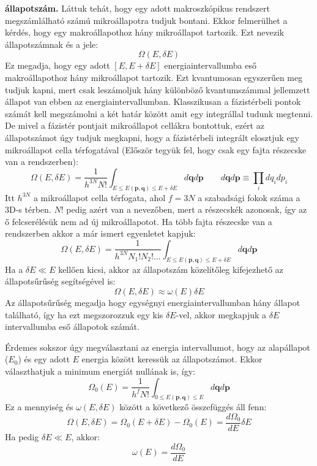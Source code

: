 \documentclass[../main.tex]{subfiles}
\begin{document}
\textbf{állapotszám.} Láttuk tehát, hogy egy adott makroszkópikus rendszert megszámlálható számú mikroállapotra tudjuk bontani. Ekkor felmerülhet a kérdés, hogy egy makroállapothoz hány mikroállapot tartozik.
Ezt nevezik állapotszámnak és a jele:
\begin{equation}
    \Omega(E, \delta E)
\end{equation}
Ez megadja, hogy egy adott $[E, E + \delta E]$ energiaintervallumba eső makroállapothoz hány mikroállapot tartozik. Ezt kvantumosan egyszerűen meg tudjuk kapni, mert csak leszámoljuk hány különböző kvantumszámmal jellemzett
állapot van ebben az energiaintervallumban. Klasszikusan a fázistérbeli pontok számát kell megszámolni a két határ között amit egy integrállal tudunk megtenni. De mivel a fázistér pontjait mikroállapot cellákra bontottuk, ezért
az állapotszámot úgy tudjuk megkapni, hogy a fázistérbeli integrált elosztjuk egy mikroállapot cella térfogatával (Először tegyük fel, hogy csak egy fajta részecske van a rendszerben):
\begin{equation}
    \Omega(E, \delta E) = \frac{1}{h^{3N} N!} \int_{E \leq E (\mathbf{p}, \mathbf{q}) \leq E + \delta E} d \mathbf{q} d \mathbf{p} \qquad d\mathbf{q} d\mathbf{p} \equiv \prod_i dq_i dp_i
\end{equation}
Itt $h^{3N}$ a mikroállapot cella térfogata, ahol $f = 3N$ a szabadsági fokok száma a 3D-s térben. $N!$ pedig azért van a nevezőben, mert a részecskék azonosak, így az ő felcserélésük nem ad új mikroállapotot.
Ha több fajta részecske van a rendszerben akkor a már ismert egyenletet kapjuk:
\begin{equation}
    \Omega(E, \delta E) = \frac{1}{h^{3N} N_1! N_2! \ldots} \int_{E \leq E (\mathbf{p}, \mathbf{q}) \leq E + \delta E} d \mathbf{q} d \mathbf{p}
\end{equation}
Ha a $\delta E \ll E$ kellően kicsi, akkor az állapotszám közelítőleg kifejezhető az állapotsűrűség segítségével is:
\begin{equation}
    \Omega(E, \delta E) \approx \omega(E) \delta E
\end{equation}
Az állapotsűrűség megadja hogy egységnyi energiaintervallumban hány állapot található, így ha ezt megszorozzuk egy kis $\delta E$-vel, akkor megkapjuk a $\delta E$ intervallumba eső állapotok számát.

Érdemes sokszor úgy megválasztani az energia intervallumot, hogy az alapállapot ($E_0$) és egy adott $E$ energia között keressük az állapotszámot. Ekkor választhatjuk a minimum energiát nullának is, így:
\begin{equation}
    \Omega_0(E) = \frac{1}{h^{f} N!} \int_{0 \leq E (\mathbf{p}, \mathbf{q}) \leq E} d \mathbf{q} d \mathbf{p}
\end{equation}
Ez a mennyiség és $\omega(E, \delta E)$ között a következő összefüggés áll fenn:
\begin{equation}
    \Omega(E, \delta E) = \Omega_0(E + \delta E) - \Omega_0(E) = \frac{d \Omega_0}{d E} \delta E
\end{equation}
Ha pedig $\delta E \ll E$, akkor:
\begin{equation}
    \omega(E) = \frac{d \Omega_0}{d E}
\end{equation}
\end{document}
